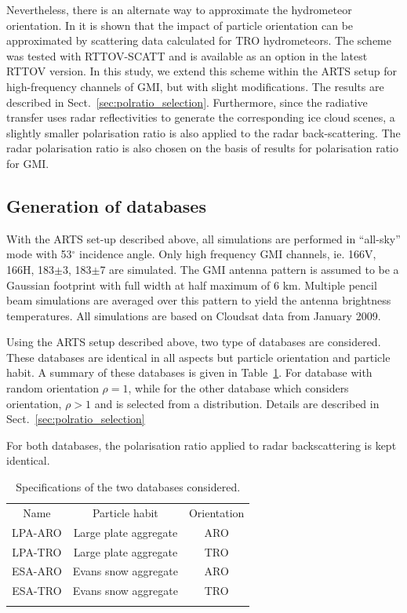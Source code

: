 \documentclass[amt, manuscript]{copernicus}
\begin{document}
Nevertheless, there is an alternate way to approximate the hydrometeor orientation. In \citet{barlakas:intro:21} it is shown that the impact of particle orientation can be approximated by scattering data calculated for TRO hydrometeors. The scheme was tested with RTTOV-SCATT \citep{saunders:rttov:18} and is available as an option in the latest RTTOV version. In this study, we extend this scheme within the ARTS setup for high-frequency channels of GMI, but with slight modifications. The results are described in Sect.~\ref{sec:polratio_selection}. Furthermore, since the radiative transfer uses radar reflectivities to generate the corresponding ice cloud scenes, a slightly smaller polarisation ratio is also applied to the radar back-scattering. The radar polarisation ratio is also chosen on the basis of results for polarisation ratio for GMI.



\subsection{Generation of databases}
\label{sec:database}

With the ARTS set-up described above, all simulations are performed in ``all-sky'' mode with 53$^{\circ}$ incidence angle. Only high frequency GMI channels, ie. 166V, 166H, 183$\pm$3, 183$\pm$7 are simulated. The GMI antenna pattern is assumed to be a Gaussian footprint with full width at half maximum of 6\,\,km. Multiple pencil beam simulations are averaged over this pattern to yield the antenna brightness temperatures. All simulations are based on Cloudsat data from January 2009.

Using the ARTS setup described above, two type of databases are considered. These databases are identical in all aspects but particle  orientation and particle habit. A summary of these databases is given in Table~\ref{tab:database_configuration}. For database with random orientation $\rho = 1$, while for the other  database which considers orientation, $\rho> 1$ and is selected from a distribution. Details are described in Sect.~\ref{sec:polratio_selection}

For both databases, the polarisation ratio applied to radar backscattering is kept identical.
 
\begin{table}[t]
	\caption{Specifications of the two databases considered.}
	\label{tab:database_configuration}	
	\begin{tabular}{ccc}
		\tophline
		Name & Particle habit 	& Orientation  \\
		\middlehline
		LPA-ARO & Large plate aggregate & ARO\\
		LPA-TRO & Large plate aggregate & TRO\\
		ESA-ARO & Evans snow aggregate  & ARO\\
		ESA-TRO & Evans snow aggregate & TRO\\
		\bottomhline
	\end{tabular}
	\belowtable{} %
\end{table}
\end{document}
